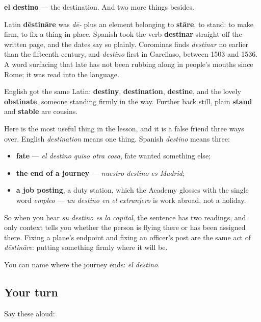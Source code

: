 \begin{cousinweb}
\textbf{el destino} — the destination. And two more things besides.

Latin \textbf{dēstināre} was \emph{dē-} plus an element belonging to \textbf{stāre}, to stand: to make firm, to fix a thing in place. Spanish took the verb \textbf{destinar} straight off the written page, and the dates say so plainly. Corominas finds \emph{destinar} no earlier than the fifteenth century, and \emph{destino} first in Garcilaso, between 1503 and 1536. A word surfacing that late has not been rubbing along in people's mouths since Rome; it was read into the language.

English got the same Latin: \textbf{destiny}, \textbf{destination}, \textbf{destine}, and the lovely \textbf{obstinate}, someone standing firmly in the way. Further back still, plain \textbf{stand} and \textbf{stable} are cousins.

Here is the most useful thing in the lesson, and it is a false friend three ways over. English \emph{destination} means one thing. Spanish \emph{destino} means three:

\begin{itemize}
\raggedright
  \item \textbf{fate} — \emph{el destino quiso otra cosa}, fate wanted something else;
  \item \textbf{the end of a journey} — \emph{nuestro destino es Madrid};
  \item \textbf{a job posting}, a duty station, which the Academy glosses with the single word \emph{empleo} — \emph{un destino en el extranjero} is work abroad, not a holiday.
\end{itemize}

So when you hear \emph{su destino es la capital}, the sentence has two readings, and only context tells you whether the person is flying there or has been assigned there. Fixing a plane's endpoint and fixing an officer's post are the same act of \emph{dēstināre}: putting something firmly where it will be.
\end{cousinweb}

\begin{grammarlens}[title={What you've built}]
You can name where the journey ends: \emph{el destino}.
\end{grammarlens}

\subsection*{Your turn}
Say these aloud:

